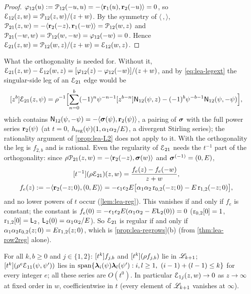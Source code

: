 \begin{proof}
$\varphi_{12}(u) := \mathcal{P}_{12}(-u,u) = -\langle\mathbf{r}_1(u),\mathbf{r}_2(-u)\rangle = 0$, so $\mathcal{E}_{12}(z,w) = \mathcal{P}_{12}(z,w)/(z+w)$. By the symmetry of $\langle\,,\rangle$, $\mathcal{P}_{21}(z,w) = -\langle\mathbf{r}_2(-z),\mathbf{r}_1(-w)\rangle = \mathcal{P}_{12}(w,z)$ and $\mathcal{P}_{21}(-w,w) = \mathcal{P}_{12}(w,-w) = \varphi_{12}(-w) = 0$. Hence $\mathcal{E}_{21}(z,w) = \mathcal{P}_{12}(w,z)/(z+w) = \mathcal{E}_{12}(w,z)$.
\end{proof}

What the orthogonality is needed for. Without it, $\mathcal{E}_{21}(z,w) - \mathcal{E}_{12}(w,z) = [\varphi_{12}(z) - \varphi_{12}(-w)]/(z+w)$, and by \eqref{eq:lea-legext} the singular-side leg of an $\mathcal{E}_{21}$ edge would be
\[
[z^b]\mathcal{E}_{21}(z,\psi) = \rho^{-1}\Bigl[\sum_{n=0}^{b}(-1)^n\psi^{-n-1}[z^{b-n}]\mathsf{N}_{12}(\psi,z) - (-1)^b\psi^{-b-1}\mathsf{N}_{12}(\psi,-\psi)\Bigr],
\]
which contains $\mathsf{N}_{12}(\psi,-\psi) = -\langle\boldsymbol{\sigma}(\psi),\mathbf{r}_2(\psi)\rangle$, a pairing of $\boldsymbol{\sigma}$ with the full power series $\mathbf{r}_2(\psi)$ (at $t = 0$, $h_{\mathrm{reg}}(\psi)(1,\alpha_1\alpha_2/E)$, a divergent Stirling series); the rationality argument of \cref{prop:lea-L2} does not apply to it. With the orthogonality the leg is $f_{2,b}$ and is rational. Even the regularity of $\mathcal{E}_{21}$ needs the $t^{-1}$ part of the orthogonality: since $\rho\mathcal{P}_{21}(z,w) = -\langle\mathbf{r}_2(-z),\boldsymbol{\sigma}(w)\rangle$ and $\boldsymbol{\sigma}^{(-1)} = (0,E)$,
\begin{gather*}
[t^{-1}](\rho\mathcal{E}_{21})(z,w) = \frac{f_e(z) - f_e(-w)}{z+w},\\
f_e(z) := -\langle\mathbf{r}_2(-z;0),(0,E)\rangle = -\epsilon_1\epsilon_2E\bigl[\alpha_1\alpha_2\,\mathrm{r}_{0,2}(-z;0) - E\,\mathrm{r}_{1,2}(-z;0)\bigr],
\end{gather*}
and no lower powers of $t$ occur (\cref{lem:lea-reg}). This vanishes if and only if $f_e$ is constant; the constant is $f_e(0) = -\epsilon_1\epsilon_2E(\alpha_1\alpha_2 - E\mathsf{L}_2(0)) = 0$ ($\mathrm{r}_{0,2}[0] = 1$, $\mathrm{r}_{1,2}[0] = \mathsf{L}_2$, $\mathsf{L}_2(0) = \alpha_1\alpha_2/E$). So $\mathcal{E}_{21}$ is regular if and only if $\alpha_1\alpha_2\mathrm{r}_{0,2}(z;0) = E\mathrm{r}_{1,2}(z;0)$, which is \cref{prop:lea-regrows}(b) (from \cref{thm:lea-row2reg} alone).

\begin{cor}
\label{cor:lea-alllegs}
For all $k,b\geq 0$ and $j\in\{1,2\}$: $[t^k]f_{j,b}$ and $[t^k](\rho f_{j,b})$ lie in $\mathscr{L}_{k+1}$; $[t^k](\rho^e\mathcal{E}_{11}(\psi,\psi'))$ lies in $\operatorname{span}\{\boldsymbol{\lambda}_i(\psi)\boldsymbol{\lambda}_l(\psi') : i,l\geq 1,\ (i-1)+(l-1)\leq k\}$ for every integer $e$; all these series are $O(t^0)$. In particular $\mathcal{E}_{1j}(z,w)\to 0$ as $z\to\infty$ at fixed order in $w$, coefficientwise in $t$ (every element of $\mathscr{L}_{k+1}$ vanishes at $\infty$).
\end{cor}

